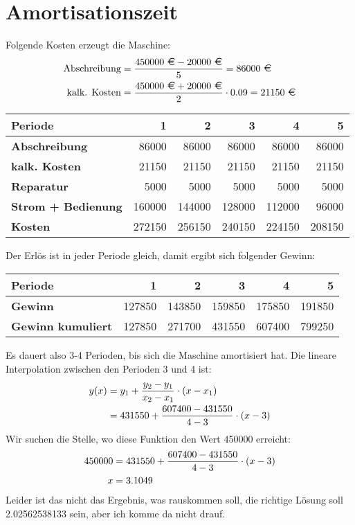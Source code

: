 \documentclass{article}
\begin{document}
	\section*{Amortisationszeit}
	Folgende Kosten erzeugt die Maschine:
	\begin{align}
		\text{Abschreibung} &= \frac{450000\text{ \EUR} - 20000\text{ \EUR}}{5} = 86000\text{ \EUR} \notag \\
		\text{kalk. Kosten} &= \frac{450000\text{ \EUR} + 20000\text{ \EUR}}{2} \cdot 0.09 = 21150 \text{ \EUR} \notag
	\end{align}
	\begin{center}
		\begin{tabular}{l|r|r|r|r|r}
			\textbf{Periode} & 1 & 2 & 3 & 4 & 5 \\
			\hline
			\textbf{Abschreibung} & 86000 & 86000 & 86000 & 86000 & 86000 \\
			\hline
			\textbf{kalk. Kosten} & 21150 & 21150 & 21150 & 21150 & 21150 \\
			\hline
			\textbf{Reparatur} & 5000 & 5000 & 5000 & 5000 & 5000 \\
			\hline
			\textbf{Strom + Bedienung} & 160000 & 144000 & 128000 & 112000 & 96000 \\
			\hline\hline
			\textbf{Kosten} & 272150 & 256150 & 240150 & 224150 & 208150
		\end{tabular}
	\end{center}
	Der Erlös ist in jeder Periode gleich, damit ergibt sich folgender Gewinn:
	\begin{center}
		\begin{tabular}{l|r|r|r|r|r}
			\textbf{Periode} & 1 & 2 & 3 & 4 & 5 \\
			\hline
			\textbf{Gewinn} & 127850 & 143850 & 159850 & 175850 & 191850 \\
			\hline
			\textbf{Gewinn kumuliert} & 127850 & 271700 & 431550 & 607400 & 799250
		\end{tabular}
	\end{center}
	Es dauert also 3-4 Perioden, bis sich die Maschine amortisiert hat. Die lineare Interpolation zwischen den Perioden 3 und 4 ist:
	\begin{align}
		y(x) &= y_1 + \frac{y_2-y_1}{x_2-x_1} \cdot (x-x_1) \notag \\
		&= 431550 + \frac{607400 - 431550}{4-3} \cdot (x-3) \notag
	\end{align}
	Wir suchen die Stelle, wo diese Funktion den Wert 450000 erreicht:
	\begin{align}
		450000 &= 431550 + \frac{607400 - 431550}{4-3} \cdot (x-3) \notag \\
		x &= 3.1049 \notag
	\end{align}
	Leider ist das nicht das Ergebnis, was rauskommen soll, die richtige Lösung soll 2.02562538133 sein, aber ich komme da nicht drauf.
	
\end{document}
